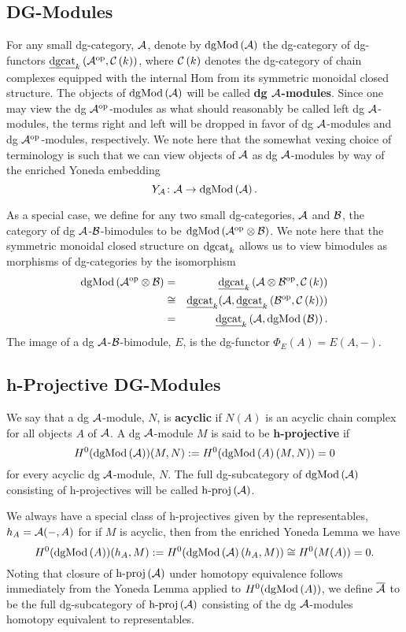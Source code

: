 \documentclass[dissertation.tex]{subfiles}
\begin{document}
\subsection{DG-Modules}\label{subsection: dg modules}
For any small dg-category, \(\mathcal{A}\), denote by \(\operatorname{dgMod}\left(\mathcal{A}\right)\) the dg-category of dg-functors \(\underline{\operatorname{dgcat}}_{k}\left(\mathcal{A}^{{\operatorname{op}}},\mathcal{C}\left(k\right)\right)\), where \(\mathcal{C}\left(k\right)\) denotes the dg-category of chain complexes equipped with the internal Hom from its symmetric monoidal closed structure.
The objects of \(\operatorname{dgMod}\left(\mathcal{A}\right)\) will be called {\bf dg \(\mathcal{A}\)-modules}.
Since one may view the dg \(\mathcal{A}^{{\operatorname{op}}}\)-modules as what should reasonably be called left dg \(\mathcal{A}\)-modules, the terms right and left will be dropped in favor of dg \(\mathcal{A}\)-modules and dg \(\mathcal{A}^{{\operatorname{op}}}\)-modules, respectively.
We note here that the somewhat vexing choice of terminology is such that we can view objects of \(\mathcal{A}\) as dg \(\mathcal{A}\)-modules by way of the enriched Yoneda embedding
\[Y_{\mathcal{A}} \colon \mathcal{A} \to \operatorname{dgMod}\left(\mathcal{A}\right).\]

As a special case, we define for any two small dg-categories, \(\mathcal{A}\) and \(\mathcal{B}\), the category of dg \(\mathcal{A}\)-\(\mathcal{B}\)-bimodules to be \(\operatorname{dgMod}\left(\mathcal{A}^{{\operatorname{op}}} \otimes \mathcal{B}\right)\).
We note here that the symmetric monoidal closed structure on \(\operatorname{dgcat}_k\) allows us to view bimodules as morphisms of dg-categories by the isomorphism
\begin{eqnarray*}
  \operatorname{dgMod}\left(\mathcal{A}^{{\operatorname{op}}} \otimes \mathcal{B}\right) &=& \underline{\operatorname{dgcat}}_{k}\left(\mathcal{A} \otimes \mathcal{B}^{{\operatorname{op}}}, \mathcal{C}\left(k\right)\right)\\
  &\cong& \underline{\operatorname{dgcat}}_{k}(\mathcal{A}, \underline{\operatorname{dgcat}}_{k}\left(\mathcal{B}^{{\operatorname{op}}}, \mathcal{C}\left(k\right)\right))\\
  &=& \underline{\operatorname{dgcat}}_{k}\left(\mathcal{A}, \operatorname{dgMod}\left(\mathcal{B}\right)\right).
\end{eqnarray*}
The image of a dg \(\mathcal{A}\)-\(\mathcal{B}\)-bimodule, \(E\), is the dg-functor \(\Phi_E(A) = E(A,-)\).

\subsection{h-Projective DG-Modules}
We say that a dg \(\mathcal{A}\)-module, \(N\), is {\bf acyclic} if \(N(A)\) is an acyclic chain complex for all objects \(A\) of \(\mathcal{A}\).
A dg \(\mathcal{A}\)-module \(M\) is said to be {\bf h-projective} if
\[H^0(\operatorname{dgMod}\left(\mathcal{A}\right))(M,N) := H^0(\operatorname{dgMod}\left(A\right)(M,N)) = 0\]
for every acyclic dg \(\mathcal{A}\)-module, \(N\).
The full dg-subcategory of \(\operatorname{dgMod}\left(\mathcal{A}\right)\) consisting of h-projectives will be called \(\operatorname{h-proj}\left(\mathcal{A}\right)\).

We always have a special class of h-projectives given by the representables, \(h_A = \mathcal{A}(-, A)\) for if \(M\) is acyclic, then from the enriched Yoneda Lemma we have
\[H^0(\operatorname{dgMod}\left(A\right))(h_A,M) := H^0(\operatorname{dgMod}\left(\mathcal{A}\right)(h_A, M)) \cong H^0(M(A)) = 0.\]
Noting that closure of \(\operatorname{h-proj}\left(\mathcal{A}\right)\) under homotopy equivalence follows immediately from the Yoneda Lemma applied to \(H^0(\operatorname{dgMod}\left(A\right))\), we define \(\overline{\mathcal{A}}\) to be the full dg-subcategory of \(\operatorname{h-proj}\left(\mathcal{A}\right)\) consisting of the dg \(\mathcal{A}\)-modules homotopy equivalent to representables.
\end{document}
